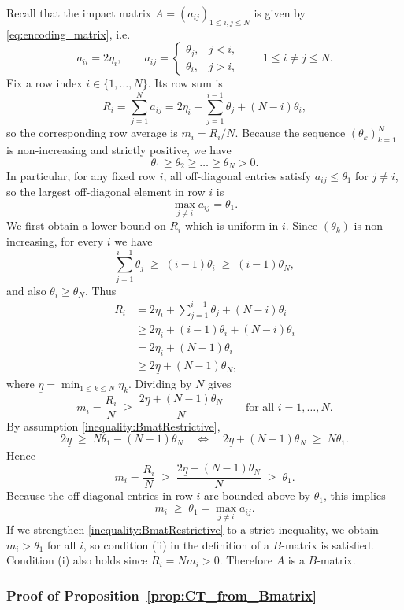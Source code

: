 \documentclass[final,3p,authoryear,12pt]{elsarticle}
\begin{document}
Recall that the impact matrix $A=(a_{ij})_{1\le i,j\le N}$ is given by
\eqref{eq:encoding_matrix}, i.e.
\[
a_{ii} = 2\eta_i,\qquad
a_{ij} =
\begin{cases}
\theta_j,& j<i,\\
\theta_i,& j>i,
\end{cases}
\qquad 1\le i\ne j\le N.
\]
Fix a row index $i\in\{1,\dots,N\}$. Its row sum is
\[
R_i = \sum_{j=1}^N a_{ij}
= 2\eta_i + \sum_{j=1}^{i-1}\theta_j + (N-i)\theta_i,
\]
so the corresponding row average is $m_i = R_i/N$.
Because the sequence $(\theta_k)_{k=1}^N$ is non-increasing and strictly
positive, we have
\[
\theta_1 \ge \theta_2 \ge \dots \ge \theta_N>0.
\]
In particular, for any fixed row $i$, all off-diagonal entries satisfy
$a_{ij}\le \theta_1$ for $j\neq i$, so the largest off-diagonal element
in row $i$ is
\[
\max_{j\ne i} a_{ij} = \theta_1.
\]
We first obtain a lower bound on $R_i$ which is uniform in $i$.
Since $(\theta_k)$ is non-increasing, for every $i$ we have
\[
\sum_{j=1}^{i-1}\theta_j
\;\ge\; (i-1)\theta_i
\;\ge\; (i-1)\theta_N,
\]
and also $\theta_i\ge\theta_N$. Thus
\begin{align*}
R_i
&= 2\eta_i + \sum_{j=1}^{i-1}\theta_j + (N-i)\theta_i \\
&\ge 2\eta_i + (i-1)\theta_i + (N-i)\theta_i \\
&= 2\eta_i + (N-1)\theta_i \\
&\ge 2\underline\eta + (N-1)\theta_N,
\end{align*}
where $\underline\eta = \min_{1\le k\le N} \eta_k$.
Dividing by $N$ gives
\[
m_i = \frac{R_i}{N}
\;\ge\;
\frac{2\underline\eta + (N-1)\theta_N}{N}
\qquad\text{for all } i=1,\dots,N.
\]
By assumption \eqref{inequality:BmatRestrictive},
\[
2\underline\eta \;\ge\; N\theta_1 - (N-1)\theta_N
\quad\Longleftrightarrow\quad
2\underline\eta + (N-1)\theta_N \;\ge\; N\theta_1.
\]
Hence
\[
m_i = \frac{R_i}{N}
\;\ge\;
\frac{2\underline\eta + (N-1)\theta_N}{N}
\;\ge\;
\theta_1.
\]
Because the off-diagonal entries in row $i$ are bounded above by
$\theta_1$, this implies
\[
m_i \;\ge\; \theta_1 = \max_{j\neq i} a_{ij}.
\]
If we strengthen \eqref{inequality:BmatRestrictive} to a strict inequality,
we obtain $m_i>\theta_1$ for all $i$, so condition (ii) in the definition
of a $B$-matrix is satisfied. Condition (i) also holds since
$R_i = N m_i > 0$. Therefore $A$ is a $B$-matrix.



\subsubsection{Proof of Proposition~\ref{prop:CT_from_Bmatrix}}
\end{document}
